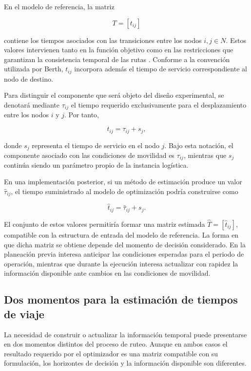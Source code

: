 \documentclass[11pt]{article}
\begin{document}
En el modelo de referencia, la matriz

\[
T=[t_{ij}]
\]

contiene los tiempos asociados con las transiciones entre los nodos
\(i,j\in N\). Estos valores intervienen tanto en la función objetivo como en
las restricciones que garantizan la consistencia temporal de las rutas
\citep{berth_thesis_2025,berth_trigos_2025}. Conforme a la convención
utilizada por Berth, \(t_{ij}\) incorpora además el tiempo de servicio
correspondiente al nodo de destino.

Para distinguir el componente que será objeto del diseño experimental, se
denotará mediante \(\tau_{ij}\) el tiempo requerido exclusivamente para el
desplazamiento entre los nodos \(i\) y \(j\). Por tanto,

\[
t_{ij}=\tau_{ij}+s_j,
\]

donde \(s_j\) representa el tiempo de servicio en el nodo \(j\). Bajo esta
notación, el componente asociado con las condiciones de movilidad es
\(\tau_{ij}\), mientras que \(s_j\) continúa siendo un parámetro propio de la
instancia logística.

En una implementación posterior, si un método de estimación produce un valor
\(\widehat{\tau}_{ij}\), el tiempo suministrado al modelo de optimización
podría construirse como

\[
\widehat{t}_{ij}=\widehat{\tau}_{ij}+s_j.
\]

El conjunto de estos valores permitiría formar una matriz estimada
\(\widehat{T}=[\widehat{t}_{ij}]\), compatible con la estructura de entrada
del modelo de referencia. La forma en que dicha matriz se obtiene depende del
momento de decisión considerado. En la planeación previa interesa anticipar
las condiciones esperadas para el periodo de operación, mientras que durante
la ejecución interesa actualizar con rapidez la información disponible ante
cambios en las condiciones de movilidad.

\subsection{Dos momentos para la estimación de tiempos de viaje}
\label{sec:momentos}

La necesidad de construir o actualizar la información temporal puede
presentarse en dos momentos distintos del proceso de ruteo. Aunque en ambos
casos el resultado requerido por el optimizador es una matriz compatible con
su formulación, los horizontes de decisión y la información disponible son
diferentes.
\end{document}
